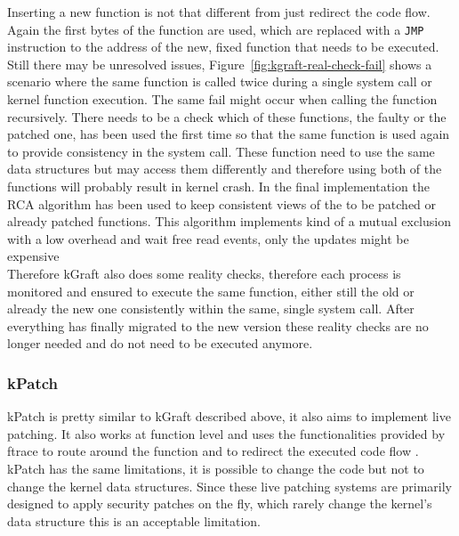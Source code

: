 \documentclass{sig-alternate-05-2015}
\begin{document}
Inserting a new function is not that different from just redirect the code flow. Again the first bytes of the function are used, which are replaced with a \texttt{JMP} instruction to the address of the new, fixed function that needs to be executed. \\ Still there may be unresolved issues, Figure~\ref{fig:kgraft-real-check-fail} shows a scenario where the same function is called twice during a single system call or kernel function execution. The same fail might occur when calling the function recursively. There needs to be a check which of these functions, the faulty or the patched one, has been used the first time so that the same function is used again to provide consistency in the system call. These function need to use the same data structures but may access them differently and therefore using both of the functions will probably result in kernel crash. In the final implementation the RCA algorithm has been used to keep consistent views of the to be patched or already patched functions. This algorithm implements kind of a mutual exclusion with a low overhead and wait free read events, only the updates might be expensive  \\
Therefore kGraft also does some reality checks, therefore each process is monitored and ensured to execute the same function, either still the old or already the new one consistently within the same, single system call. After everything has finally migrated to the new version these reality checks are no longer needed and do not need to be executed anymore. 

\subsubsection{kPatch}
kPatch is pretty similar to kGraft described above, it also aims to implement live patching. It also works at function level and uses the functionalities provided by ftrace to route around the function and to redirect the executed code flow \cite{kpatch}. kPatch has the same limitations, it is possible to change the code but not to change the kernel data structures. Since these live patching systems are primarily designed to apply security patches on the fly, which rarely change the kernel's data structure this is an acceptable limitation.



\end{document}
